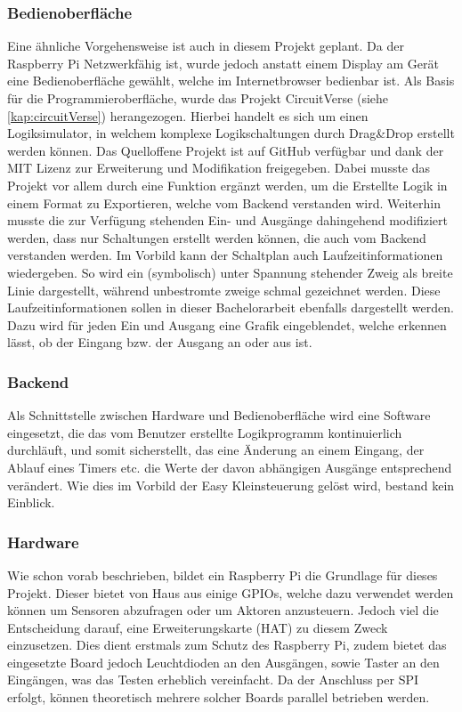 \subsubsection{Bedienoberfläche} \label{kap:grundl:bedienoberfl}
Eine ähnliche Vorgehensweise ist auch in diesem Projekt geplant. Da der Raspberry Pi Netzwerkfähig ist, wurde jedoch anstatt einem Display am Gerät eine Bedienoberfläche gewählt, welche im Internetbrowser bedienbar ist. Als Basis für die Programmieroberfläche, wurde das Projekt CircuitVerse \cite{URL:CircuitVerse} (siehe \autoref{kap:circuitVerse})  herangezogen. Hierbei handelt es sich um einen Logiksimulator, in welchem komplexe Logikschaltungen durch Drag\&Drop erstellt werden können. Das Quelloffene Projekt ist auf GitHub \cite{URL:CircuitVerseGit} verfügbar und dank der MIT Lizenz zur Erweiterung und Modifikation freigegeben. Dabei musste das Projekt vor allem durch eine Funktion ergänzt werden, um die Erstellte Logik in einem Format zu Exportieren, welche vom Backend verstanden wird. Weiterhin musste die zur Verfügung stehenden Ein- und Ausgänge dahingehend modifiziert werden, dass nur Schaltungen erstellt werden können, die auch vom Backend verstanden werden. 
Im Vorbild kann der Schaltplan auch Laufzeitinformationen wiedergeben. So wird ein (symbolisch) unter Spannung stehender Zweig als breite Linie dargestellt, während unbestromte zweige schmal gezeichnet werden. Diese Laufzeitinformationen sollen in dieser Bachelorarbeit ebenfalls dargestellt werden. Dazu wird für jeden Ein und Ausgang eine Grafik eingeblendet, welche erkennen lässt, ob der Eingang bzw. der Ausgang an oder aus ist.
\subsubsection{Backend} \label{chp:grundl:backend}
Als Schnittstelle zwischen Hardware und Bedienoberfläche wird eine Software eingesetzt, die das vom Benutzer erstellte Logikprogramm kontinuierlich durchläuft, und somit sicherstellt, das eine Änderung an einem Eingang, der Ablauf eines Timers etc. die Werte der davon abhängigen Ausgänge entsprechend verändert. Wie dies im Vorbild der Easy Kleinsteuerung gelöst wird, bestand kein Einblick.  

\subsubsection{Hardware} 
Wie schon vorab beschrieben, bildet ein Raspberry Pi die Grundlage für dieses Projekt. Dieser bietet von Haus aus einige GPIOs, welche  dazu  verwendet werden können um Sensoren abzufragen oder um Aktoren anzusteuern. Jedoch viel die Entscheidung darauf, eine Erweiterungskarte (HAT) zu diesem Zweck einzusetzen. Dies dient erstmals zum Schutz des Raspberry Pi, zudem bietet das eingesetzte Board jedoch Leuchtdioden an den Ausgängen, sowie Taster an den Eingängen, was das Testen erheblich vereinfacht. Da der Anschluss per SPI erfolgt, können theoretisch mehrere solcher Boards parallel betrieben werden. 

